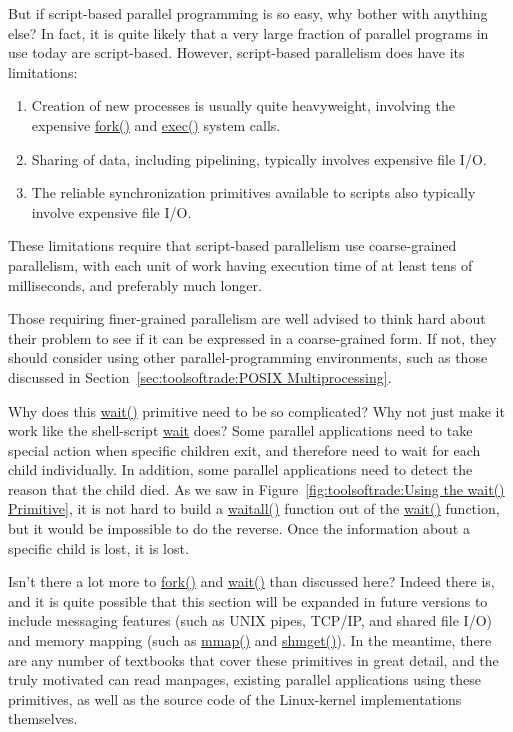 \QuickQ{}
	But if script-based parallel programming is so easy, why
	bother with anything else?
\QuickA{}
	In fact, it is quite likely that a very large fraction of
	parallel programs in use today are script-based.
	However, script-based parallelism does have its limitations:
	\begin{enumerate}
	\item	Creation of new processes is usually quite heavyweight,
		involving the expensive \url{fork()} and \url{exec()}
		system calls.
	\item	Sharing of data, including pipelining, typically involves
		expensive file I/O.
	\item	The reliable synchronization primitives available to
		scripts also typically involve expensive file I/O.
	\end{enumerate}
	These limitations require that script-based parallelism use
	coarse-grained parallelism, with each unit of work having
	execution time of at least tens of milliseconds, and preferably
	much longer.

	Those requiring finer-grained parallelism are well advised to
	think hard about their problem to see if it can be expressed
	in a coarse-grained form.
	If not, they should consider using other parallel-programming
	environments, such as those discussed in
	Section~\ref{sec:toolsoftrade:POSIX Multiprocessing}.

\QuickQ{}
	Why does this \url{wait()} primitive need to be so complicated?
	Why not just make it work like the shell-script \url{wait} does?
\QuickA{}
	Some parallel applications need to take special action when
	specific children exit, and therefore need to wait for each
	child individually.
	In addition, some parallel applications need to detect the
	reason that the child died.
	As we saw in Figure~\ref{fig:toolsoftrade:Using the wait() Primitive},
	it is not hard to build a \url{waitall()} function out of
	the \url{wait()} function, but it would be impossible to
	do the reverse.
	Once the information about a specific child is lost, it is lost.

\QuickQ{}
	Isn't there a lot more to \url{fork()} and \url{wait()}
	than discussed here?
\QuickA{}
	Indeed there is, and
	it is quite possible that this section will be expanded in
	future versions to include messaging features (such as UNIX
	pipes, TCP/IP, and shared file I/O) and memory mapping
	(such as \url{mmap()} and \url{shmget()}).
	In the meantime, there are any number of textbooks that cover
	these primitives in great detail,
	and the truly motivated can read manpages, existing parallel
	applications using these primitives, as well as the
	source code of the Linux-kernel implementations themselves.

